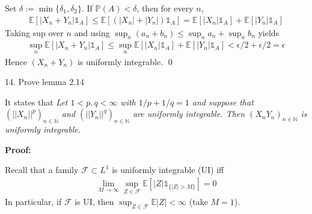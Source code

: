 \documentclass[10pt]{article}
\begin{document}
Set $\delta := \min\{\delta_1, \delta_2\}$. If $\mathbb{P}(A) < \delta$, then for every $n$,
\begin{gather*}
    \mathbb{E}[|X_n + Y_n|\mathbb{1}_A] \le \mathbb{E}[(|X_n| + |Y_n|)\mathbb{1}_A] = \mathbb{E}[|X_n|\mathbb{1}_A] + \mathbb{E}[|Y_n|\mathbb{1}_A]
\end{gather*}
Taking sup over $n$ and using $\sup_n (a_n + b_n) \le \sup_n a_n + \sup_n b_n$ yields
\begin{gather*}
    \sup_n \mathbb{E}[|X_n + Y_n|\mathbb{1}_A] \le \sup_n \mathbb{E}[|X_n|\mathbb{1}_A] + \mathbb{E}[|Y_n|\mathbb{1}_A] < \epsilon / 2 + \epsilon / 2 = \epsilon
\end{gather*}
Hence $(X_n + Y_n)$ is uniformly integrable. \qed

\newpage

14. Prove lemma 2.14

It states that \textit{Let $1 < p, q < \infty$ with $1/p + 1/q = 1$ and suppose that $(||X_n||^p)_{n \in \mathbb{N}}$ and $(||Y_n||^q)_{n \in \mathbb{N}}$ are uniformly integrable. Then $(X_nY_n)_{n \in \mathbb{N}}$ is uniformly integrable.}

\textbf{Proof:}

Recall that a family $\mathcal{F} \subset L^1$ is uniformly integrable (UI) iff 
\begin{gather*}
    \lim_{M \to \infty}\sup_{Z \in \mathcal{F}}\mathbb{E}[|Z|\mathbb{1}_{\{|Z| > M\}}] = 0
\end{gather*}
In particular, if $\mathcal{F}$ is UI, then $\sup_{Z \in \mathcal{F}}\mathbb{E}|Z| < \infty$ (take $M = 1$).
\end{document}

